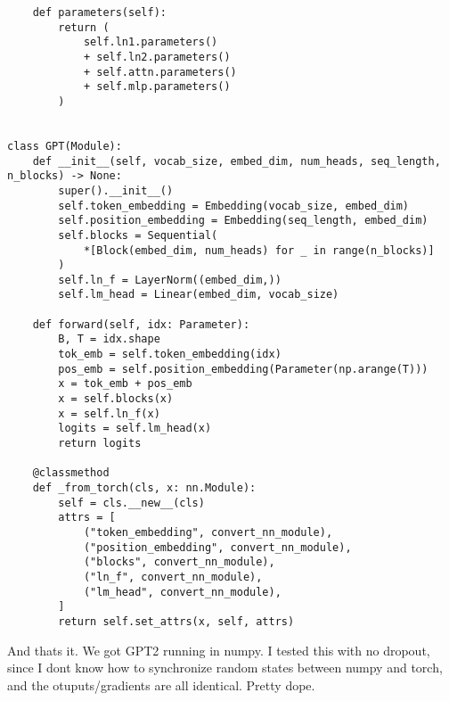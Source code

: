 \documentclass[11pt]{article}
\begin{document}
\begin{verbatim}
    def parameters(self):
        return (
            self.ln1.parameters()
            + self.ln2.parameters()
            + self.attn.parameters()
            + self.mlp.parameters()
        )


class GPT(Module):
    def __init__(self, vocab_size, embed_dim, num_heads, seq_length, n_blocks) -> None:
        super().__init__()
        self.token_embedding = Embedding(vocab_size, embed_dim)
        self.position_embedding = Embedding(seq_length, embed_dim)
        self.blocks = Sequential(
            *[Block(embed_dim, num_heads) for _ in range(n_blocks)]
        )
        self.ln_f = LayerNorm((embed_dim,))
        self.lm_head = Linear(embed_dim, vocab_size)

    def forward(self, idx: Parameter):
        B, T = idx.shape
        tok_emb = self.token_embedding(idx)
        pos_emb = self.position_embedding(Parameter(np.arange(T)))
        x = tok_emb + pos_emb
        x = self.blocks(x)
        x = self.ln_f(x)
        logits = self.lm_head(x)
        return logits

    @classmethod
    def _from_torch(cls, x: nn.Module):
        self = cls.__new__(cls)
        attrs = [
            ("token_embedding", convert_nn_module),
            ("position_embedding", convert_nn_module),
            ("blocks", convert_nn_module),
            ("ln_f", convert_nn_module),
            ("lm_head", convert_nn_module),
        ]
        return self.set_attrs(x, self, attrs)
\end{verbatim}
And thats it. We got GPT2 running in numpy. I tested this with no dropout, since I dont know how to synchronize
random states between numpy and torch, and the otuputs/gradients are all identical. Pretty dope.
\end{document}
